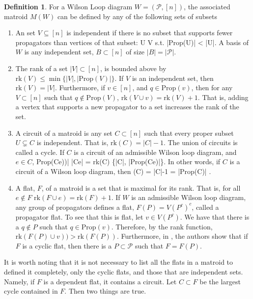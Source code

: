 \documentclass[11pt]{article}
\newcommand{\rk}{\textrm{rk}}
\def\bas #1\eas{\begin{align*} #1 \end{align*}}
\newcommand{\cP}{\mathcal{P}}
\newcommand{\Prop}{\textrm{Prop}}
\theoremstyle{remark}
\theoremstyle{definition}
\newtheorem{dfn}[thm]{Definition}
\begin{document}
\begin{dfn} For a Wilson Loop diagram $W = (\cP, [n])$, the associated matroid $M(W)$ can be defined by any of the following sets of subsets
\begin{enumerate}
\item An set $V \subseteq [n]$ is independent if there is no subset that supports fewer propagators than vertices of that subset: \bas \not \exists U \subseteq V \; \textrm{s.t. } |\Prop (U)| < |U|\;. \eas A basis of $W$ is any independent set, $B \subset [n]$ of size $|B| = |\cP|$.
\item The rank of a set $|V| \subset [n]$, is bounded above by $\rk(V) \leq \min\{ |V| , |\Prop(V)|\}$. If $V$ is an independent set, then $\rk(V) = |V|$. Furthermore, if $v \in [n]$, and $q \in \Prop(v)$, then for any $V \subset [n]$ such that $q \not \in \Prop(V)$, $\rk(V \cup v) = \rk(V) +1$. That is, adding a vertex that supports a new propagator to a set increases the rank of the set.
\item A circuit of a matroid is any set $C \subset [n]$ such that every proper subset $U \subsetneq C$ is independent. That is, $\rk(C) = |C|-1$. The union of circuits is called a cycle. If $C$ is a circuit of an admissible Wilson loop diagram, and $e \in C$, \bas |\Prop(C\setminus e))| \leq |C\setminus e| = \rk(C) \leq \min\{|C|, |\Prop(C\setminus e)|\}\;.\eas
    In other words, if $C$ is a circuit of a Wilson loop diagram, then \bas \rk(C) = |C|-1 = |\Prop(C)| \;. \eas
\item A flat, $F$, of a matroid is a set that is maximal for its rank. That is, for all $e \not \in F$ $\rk(F \cup e) = \rk(F) +1$. If $W$ is an admissible Wilson loop diagram, any group of propagators defines a flat, $F(P) = V(P^c)^c$, called a propagator flat. To see that this is flat, let $v \in V(P^c)$. We have that there is a $q \not \in P$ such that $q \in \Prop(v)$. Therefore, by the rank function, $\rk( F(P) \cup v))> \rk(F(P))$. Furthermore, in \cite{wilsonloops}, the authors show that if $F$ is a cyclic flat, then there is a $P \subset \cP$ such that $F = F(P)$.

\end{enumerate}
\end{dfn}

It is worth noting that it is not necessary to list all the flats in a matroid to defined it completely, only the cyclic flats, and those that are independent sets. Namely, if $F$ is a dependent flat, it contains a circuit. Let $C \subset F$ be the largest cycle contained in $F$. Then two things are true.
\end{document}
